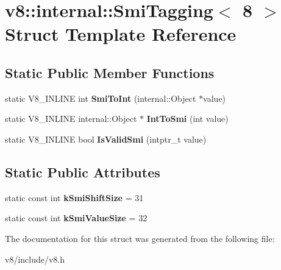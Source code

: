 \hypertarget{structv8_1_1internal_1_1SmiTagging_3_018_01_4}{\section{v8\-:\-:internal\-:\-:Smi\-Tagging$<$ 8 $>$ Struct Template Reference}
\label{structv8_1_1internal_1_1SmiTagging_3_018_01_4}
}
\subsection*{Static Public Member Functions}
\begin{DoxyCompactItemize}
\item 
\hypertarget{structv8_1_1internal_1_1SmiTagging_3_018_01_4_aa1573b36c3b6af28c449b2ca993ffb81}{static V8\-\_\-\-I\-N\-L\-I\-N\-E int {\bfseries Smi\-To\-Int} (internal\-::\-Object $\ast$value)}\label{structv8_1_1internal_1_1SmiTagging_3_018_01_4_aa1573b36c3b6af28c449b2ca993ffb81}

\item 
\hypertarget{structv8_1_1internal_1_1SmiTagging_3_018_01_4_a1926f38e35fc98fe244e8136180d70f2}{static V8\-\_\-\-I\-N\-L\-I\-N\-E internal\-::\-Object $\ast$ {\bfseries Int\-To\-Smi} (int value)}\label{structv8_1_1internal_1_1SmiTagging_3_018_01_4_a1926f38e35fc98fe244e8136180d70f2}

\item 
\hypertarget{structv8_1_1internal_1_1SmiTagging_3_018_01_4_a5ab93d4cf7c3b9ceff5116b3598a1f94}{static V8\-\_\-\-I\-N\-L\-I\-N\-E bool {\bfseries Is\-Valid\-Smi} (intptr\-\_\-t value)}\label{structv8_1_1internal_1_1SmiTagging_3_018_01_4_a5ab93d4cf7c3b9ceff5116b3598a1f94}

\end{DoxyCompactItemize}
\subsection*{Static Public Attributes}
\begin{DoxyCompactItemize}
\item 
\hypertarget{structv8_1_1internal_1_1SmiTagging_3_018_01_4_a9a3b3da7b6d82417b961c8bed4366407}{static const int {\bfseries k\-Smi\-Shift\-Size} = 31}\label{structv8_1_1internal_1_1SmiTagging_3_018_01_4_a9a3b3da7b6d82417b961c8bed4366407}

\item 
\hypertarget{structv8_1_1internal_1_1SmiTagging_3_018_01_4_a08ad86fa77f6faee6ec744abdb0f6dce}{static const int {\bfseries k\-Smi\-Value\-Size} = 32}\label{structv8_1_1internal_1_1SmiTagging_3_018_01_4_a08ad86fa77f6faee6ec744abdb0f6dce}

\end{DoxyCompactItemize}


The documentation for this struct was generated from the following file\-:\begin{DoxyCompactItemize}
\item 
v8/include/v8.\-h\end{DoxyCompactItemize}
